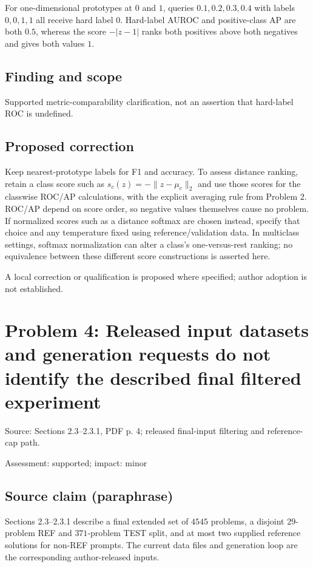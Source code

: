 \documentclass[11pt]{article}
\begin{document}
For one-dimensional prototypes at \(0\) and \(1\), queries \(0.1,0.2,0.3,0.4\) with labels \(0,0,1,1\) all receive hard label \(0\). Hard-label AUROC and positive-class AP are both \(0.5\), whereas the score \(-|z-1|\) ranks both positives above both negatives and gives both values \(1\).

\subsection*{Finding and scope}

Supported metric-comparability clarification, not an assertion that hard-label ROC is undefined.

\subsection*{Proposed correction}

Keep nearest-prototype labels for F1 and accuracy. To assess distance ranking, retain a class score such as \(s_c(z)=-\|z-\mu_c\|_2\) and use those scores for the classwise ROC/AP calculations, with the explicit averaging rule from Problem 2. ROC/AP depend on score order, so negative values themselves cause no problem. If normalized scores such as a distance softmax are chosen instead, specify that choice and any temperature fixed using reference/validation data. In multiclass settings, softmax normalization can alter a class’s one-versus-rest ranking; no equivalence between these different score constructions is asserted here.

A local correction or qualification is proposed where specified; author adoption is not established.

\section*{Problem 4: Released input datasets and generation requests do not identify the described final filtered experiment}

Source: Sections 2.3–2.3.1, PDF p. 4; released final-input filtering and reference-cap path.

Assessment: supported; impact: minor

\subsection*{Source claim (paraphrase)}

Sections 2.3–2.3.1 describe a final extended set of \(4545\) problems, a disjoint \(29\)-problem REF and \(371\)-problem TEST split, and at most two supplied reference solutions for non-REF prompts. The current data files and generation loop are the corresponding author-released inputs.
\end{document}
